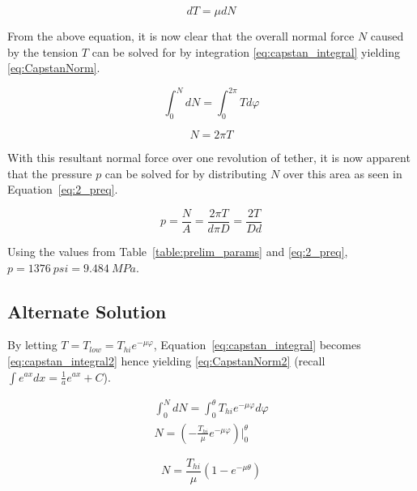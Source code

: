 \begin{equation}
	\label{eq:diffTens}
	dT = \mu dN
\end{equation}

From the above equation, it is now clear that the overall normal force $N$ caused by the tension $T$ can be solved for by integration \ref{eq:capstan_integral} yielding \ref{eq:CapstanNorm}.

\begin{equation}
	\label{eq:capstan_integral}
	\int_0^N dN =\int_0^{2\pi} T d\varphi
\end{equation}

\begin{equation}
	\label{eq:CapstanNorm}
	N=2\pi T	
\end{equation}

With this resultant normal force over one revolution of tether, it is now apparent that the pressure $p$ can be solved for by distributing $N$ over this area as seen in Equation~\ref{eq:2_preq}.

\begin{equation}
	\label{eq:2_preq}
	p=\frac{N}{A}=\frac{2\pi T}{d\pi D}=\frac{2T}{Dd}
\end{equation}

Using the values from Table~\ref{table:prelim_params} and \ref{eq:2_preq}, $p=1376\  psi= 9.484\  MPa$. 

\subsection{Alternate Solution}

By letting $T= T_{low} = T_{hi} e^{-\mu \varphi}$, Equation~\ref{eq:capstan_integral} becomes \ref{eq:capstan_integral2} hence yielding \ref{eq:CapstanNorm2} (recall $\int e^{ax} dx = \frac{1}{a} e^{ax} + C$).

\begin{equation}
	\label{eq:capstan_integral2}
	\begin{aligned}
	\int_0^N dN =\int_0^{\theta} T_{hi} e^{-\mu \varphi} d\varphi \\
	N = \left( -\frac{T_{hi}}{\mu} e^{-\mu \varphi} \right) \Big|_0^{\theta}
	\end{aligned}
\end{equation}

\begin{equation}
	\label{eq:CapstanNorm2}
	N = \frac{T_{hi}}{\mu} \left( 1 - e^{-\mu \theta} \right)
\end{equation}


